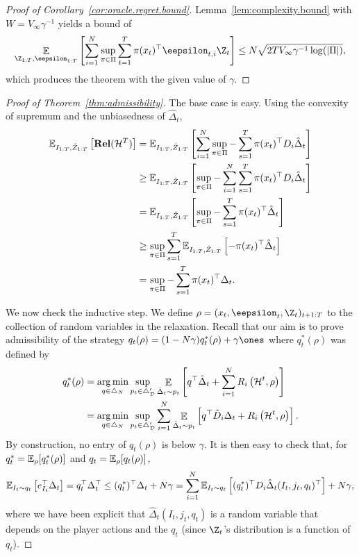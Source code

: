 \documentclass{article}
\newcommand{\exop}{\mathop{\ex}}
\newcommand{\rel}{\mathbf{Rel}}
\newcommand{\hist}{{\mathcal H}}
\begin{document}
\begin{proof}[Proof of Corollary~\ref{cor:oracle.regret.bound}]
  Lemma~\ref{lem:complexity.bound} with $W = V_\infty \gamma^{-1}$ yields a bound of
  \[
    \exop_{\Z_{1:T},\eepsilon_{1:T}}\left[\sum_{i=1}^N\sup_{\pi\in\Pi} \sum_{t=1}^T \pi(x_t)^\top \eepsilon_{t,i} \Z_t \right] \leq N \sqrt{2 T V_\infty \gamma^{-1} \log(\vert \Pi\vert)},
  \]
  which produces the theorem with the given value of $\gamma$.
\end{proof}


\begin{proof}[Proof of Theorem~\ref{thm:admissibility}]
  The base case is easy. Using the convexity of supremum and the unbiasedness of $\hat\Delta_t$,
  \begin{align*}
  \ex_{I_{1:T},\hat Z_{1:T}}\left[
  \rel(\hist^T)
  \right]
  &=
    \ex_{I_{1:T},\hat Z_{1:T}}\left[
    \sum_{i=1}^N\sup_{\pi\in\Pi}
    -\sum_{s=1}^T \pi(x_t)^\top D_i \hat \Delta_t
    \right]\\
  &\geq
    \ex_{I_{1:T},\hat Z_{1:T}}\left[
    \sup_{\pi\in\Pi}
    -\sum_{i=1}^N \sum_{s=1}^T \pi(x_t)^\top D_i \hat \Delta_t
    \right]\\
  &=
    \ex_{I_{1:T},\hat Z_{1:T}}\left[    
    \sup_{\pi\in\Pi}
    -\sum_{s=1}^T \pi(x_t)^\top \hat \Delta_t
    \right]\\
  &\geq
    \sup_{\pi\in\Pi}
    \sum_{s=1}^T
    \ex_{I_{1:T},\hat Z_{1:T}}\left[
    - \pi(x_t)^\top \hat \Delta_t
    \right]\\
  &=
    \sup_{\pi\in\Pi}
    -\sum_{s=1}^T \pi(x_t)^\top \Delta_t.
  \end{align*}

  We now check the inductive step. We define $\rho = (x_t,\eepsilon_t,\Z_t)_{t+1:T}$ to the collection of random variables in the relaxation. Recall that our aim is to prove admissibility of the strategy $q_t(\rho) = (1-N\gamma)q_t^*(\rho)+ \gamma \ones$ where $q_t^*(\rho)$ was defined by
  \begin{align*}
  q_t^*(\rho)
  &=
  \argmin_{q \in \triangle_{N}}
  \sup_{p_t \in \triangle_{\mathcal D}'} 
    \exop_{\hat\Delta_t \sim p_t}\left[
    q^\top\hat\Delta_t
    +  \sum_{i=1}^N R_i\left(\hist^{t},\rho\right)
    \right]
    \\
    &=
      \argmin_{q \in \triangle_{N}}
  \sup_{p_t \in \triangle_{\mathcal D}'} 
    \sum_{i=1}^N
    \exop_{\hat\Delta_t \sim p_t}\left[
    q^\top\hat D_i\Delta_t
    +   R_i\left(\hist^{t},\rho\right)
    \right].
\end{align*}
By construction, no entry of $q_t(\rho)$ is below $\gamma$. It is then easy to check that, for $q_t^* = \mathbb E_{\rho}[q_t^*(\rho)]$ and $q_t = \mathbb E_{\rho}[q_t(\rho)]$,
\begin{align*}
  \mathbb E_{I_t \sim q_t}\left[ e_{I_t}^\top \Delta_t \right] = q_t^\top \Delta_t^\top 
  \leq (q_t^*)^\top \Delta_t + N\gamma
  =
  \sum_{i=1}^N \mathbb E_{I_t\sim q_t} \left[(q_t^*)^\top D_i \hat\Delta_t(I_t,j_t,q_t)^\top \right] + N\gamma,
\end{align*}
where we have been explicit that $\hat\Delta_t(I_t,j_t,q_t)$ is a random variable that depends on the player actions and the $q_t$ (since $\Z_t$'s distribution is a function of $q_t$). 


\end{proof}
\end{document}
